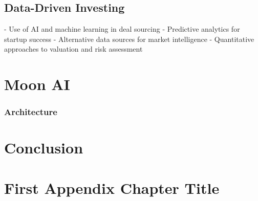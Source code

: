 \documentclass[a4paper, oneside]{discothesis}
\begin{document}
\section{Data-Driven Investing}
- Use of AI and machine learning in deal sourcing
- Predictive analytics for startup success
- Alternative data sources for market intelligence
- Quantitative approaches to valuation and risk assessment


\chapter{Moon AI}
\subsection{Architecture}

\chapter{Conclusion}





\appendix
\chapter{First Appendix Chapter Title}
\end{document}
